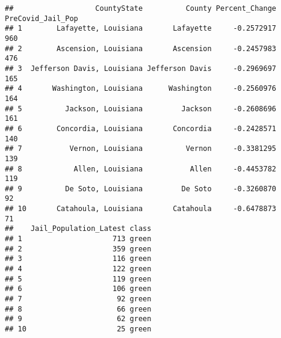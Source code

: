 \documentclass[
]{article}
\newenvironment{Shaded}{\begin{snugshade}}{\end{snugshade}}
\newcommand{\CommentTok}[1]{\textcolor[rgb]{0.56,0.35,0.01}{\textit{#1}}}
\newcommand{\DataTypeTok}[1]{\textcolor[rgb]{0.13,0.29,0.53}{#1}}
\newcommand{\DecValTok}[1]{\textcolor[rgb]{0.00,0.00,0.81}{#1}}
\newcommand{\KeywordTok}[1]{\textcolor[rgb]{0.13,0.29,0.53}{\textbf{#1}}}
\newcommand{\NormalTok}[1]{#1}
\newcommand{\OperatorTok}[1]{\textcolor[rgb]{0.81,0.36,0.00}{\textbf{#1}}}
\newcommand{\StringTok}[1]{\textcolor[rgb]{0.31,0.60,0.02}{#1}}
\begin{document}
\begin{Shaded}
\end{Shaded}

\begin{verbatim}
##                   CountyState          County Percent_Change PreCovid_Jail_Pop
## 1        Lafayette, Louisiana       Lafayette     -0.2572917               960
## 2        Ascension, Louisiana       Ascension     -0.2457983               476
## 3  Jefferson Davis, Louisiana Jefferson Davis     -0.2969697               165
## 4       Washington, Louisiana      Washington     -0.2560976               164
## 5          Jackson, Louisiana         Jackson     -0.2608696               161
## 6        Concordia, Louisiana       Concordia     -0.2428571               140
## 7           Vernon, Louisiana          Vernon     -0.3381295               139
## 8            Allen, Louisiana           Allen     -0.4453782               119
## 9          De Soto, Louisiana         De Soto     -0.3260870                92
## 10       Catahoula, Louisiana       Catahoula     -0.6478873                71
##    Jail_Population_Latest class
## 1                     713 green
## 2                     359 green
## 3                     116 green
## 4                     122 green
## 5                     119 green
## 6                     106 green
## 7                      92 green
## 8                      66 green
## 9                      62 green
## 10                     25 green
\end{verbatim}
\end{document}
